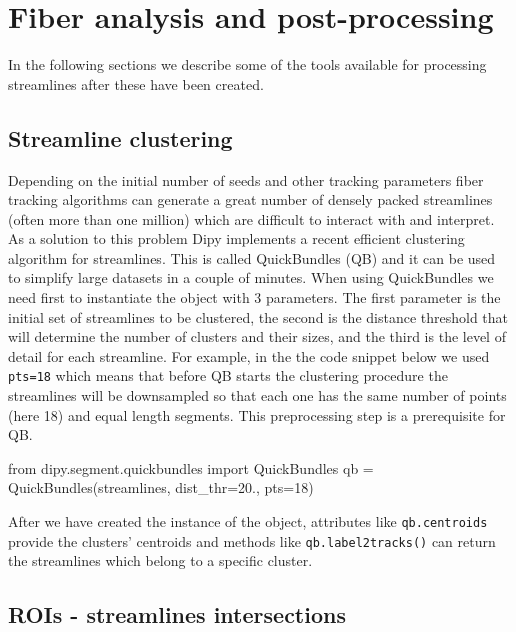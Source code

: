 \documentclass{bioinfo}
\begin{document}
\section{Fiber analysis and post-processing}\label{post_tracking}

In the following sections we describe some of the tools available for processing
streamlines after these have been created.
\subsection{Streamline clustering}\label{quickbundles}
Depending on the initial number of seeds and other tracking parameters
fiber tracking algorithms can generate a great number of densely packed
streamlines (often more than one million) which are difficult to interact with
and interpret. As a solution to this problem Dipy implements a recent
efficient clustering algorithm for streamlines. This is called QuickBundles (QB)
\citep{Garyfallidis_thesis,garyfallidis-etal:12} and it can be used to
simplify large datasets in a couple of minutes.
When using QuickBundles we need first to instantiate the object with 3
parameters. The first parameter is the initial set of streamlines to be
clustered, the second is the distance threshold that will determine the number of clusters and their sizes,
and the third is the level of detail for each streamline. For example, in the
the code snippet below we used \texttt{pts=18} which means that before QB
starts the clustering procedure the streamlines will be downsampled so that
each one has the same number of points (here 18) and equal length segments. This
preprocessing step is a prerequisite for QB.
\begin{python}
from dipy.segment.quickbundles import QuickBundles
qb = QuickBundles(streamlines, dist_thr=20.,
                  pts=18)
\end{python}
After we have created the instance of the object, attributes like
\texttt{qb.centroids} provide the clusters' centroids and methods like
\texttt{qb.label2tracks()} can return the streamlines which belong to a
specific cluster.

\subsection{ROIs - streamlines intersections}
\end{document}
